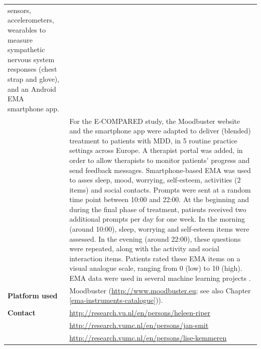 \documentclass[]{book}
\begin{document}
\begin{longtable}[]{@{}ll@{}}
\begin{minipage}[t]{0.69\columnwidth}
sensors, accelerometers, wearables to measure sympathetic nervous system
responses (chest strap and glove), and an Android EMA smartphone
app.\strut
\end{minipage}\tabularnewline
\begin{minipage}[t]{0.25\columnwidth}\raggedright\strut
\strut
\end{minipage} & \begin{minipage}[t]{0.69\columnwidth}\raggedright\strut
For the E-COMPARED study, the Moodbuster website and the smartphone app
were adapted to deliver (blended) treatment to patients with MDD, in 5
routine practice settings across Europe. A therapist portal was added,
in order to allow therapists to monitor patients' progress and send
feedback messages. Smartphone-based EMA was used to asses sleep, mood,
worrying, self-esteem, activities (2 items) and social contacts. Prompts
were sent at a random time point between 10:00 and 22:00. At the
beginning and during the final phase of treatment, patients received two
additional prompts per day for one week. In the morning (around 10:00),
sleep, worrying and self-esteem items were assessed. In the evening
(around 22:00), these questions were repeated, along with the activity
and social interaction items. Patients rated these EMA items on a visual
analogue scale, ranging from 0 (low) to 10 (high). EMA data were used in
several machine learning projects
\citep{mikus2018, rocha2018, VanBreda2018, VandeVen2017}.\strut
\end{minipage}\tabularnewline
\begin{minipage}[t]{0.25\columnwidth}\raggedright\strut
\textbf{Platform used}\strut
\end{minipage} & \begin{minipage}[t]{0.69\columnwidth}\raggedright\strut
Moodbuster (\url{http://www.moodbuster.eu}; see also Chapter
\ref{ema-instruments-catalogue})).\strut
\end{minipage}\tabularnewline
\begin{minipage}[t]{0.25\columnwidth}\raggedright\strut
\textbf{Contact}\strut
\end{minipage} & \begin{minipage}[t]{0.69\columnwidth}\raggedright\strut
\url{http://research.vu.nl/en/persons/heleen-riper}\strut
\end{minipage}\tabularnewline
\begin{minipage}[t]{0.25\columnwidth}\raggedright\strut
\strut
\end{minipage} & \begin{minipage}[t]{0.69\columnwidth}\raggedright\strut
\url{http://research.vumc.nl/en/persons/jan-smit}\strut
\end{minipage}\tabularnewline
\begin{minipage}[t]{0.25\columnwidth}\raggedright\strut
\strut
\end{minipage} & \begin{minipage}[t]{0.69\columnwidth}\raggedright\strut
\url{http://research.vumc.nl/en/persons/lise-kemmeren}\strut
\end{minipage}\tabularnewline
\bottomrule
\end{longtable}
\end{document}
